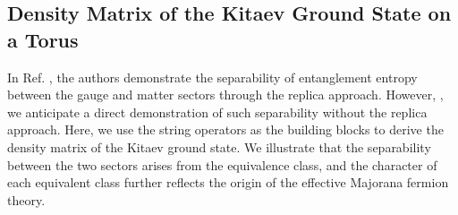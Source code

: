 \subsection{Density Matrix of the Kitaev Ground State on a Torus}\label{sec:density-matrix-calculate}



In Ref. \cite{Yao-Qi_2010}, the authors demonstrate the separability of entanglement entropy between the gauge and matter sectors through the replica approach. However, , we anticipate a direct demonstration of such separability without the replica approach. Here, we use the string operators as the building blocks to derive the density matrix of the Kitaev ground state. We illustrate that the separability between the two sectors arises from the equivalence class, and the character of each equivalent class further reflects the origin of the effective Majorana fermion theory.


